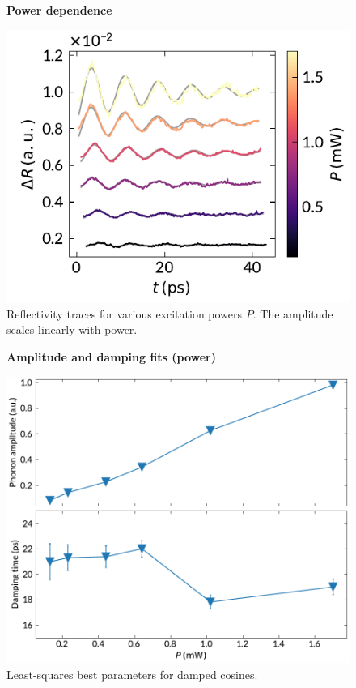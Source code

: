 \documentclass[nobib]{tufte-handout}
\begin{document}
\begin{figure}
	\centering
	\textbf{Power dependence}\par\medskip
	\includegraphics[width=\linewidth]{Graphics/traces_v_power.pdf}
	\caption{Reflectivity traces for various excitation powers \( P \). The amplitude scales linearly with power.}
	\label{fig:fluence}
\end{figure}

\begin{figure}
	\centering
	\textbf{Amplitude and damping fits (power)}\par\medskip
	\includegraphics[width=\linewidth]{Graphics/amp_damp_power.pdf}
	\caption{Least-squares best parameters for damped cosines.}
	\label{fig:fits_power}
\end{figure}
\end{document}
